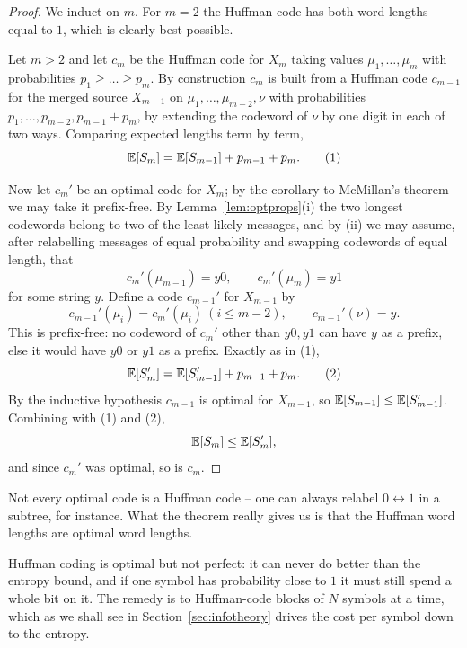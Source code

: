 \documentclass[a4paper]{scrartcl}
\begin{document}
\begin{proof}
	We induct on $m$. For $m = 2$ the Huffman code has both word lengths equal to $1$, which is clearly best possible.

	Let $m > 2$ and let $c_m$ be the Huffman code for $X_m$ taking values $\mu_1, \dots, \mu_m$ with probabilities $p_1 \ge \dots \ge p_m$. By construction $c_m$ is built from a Huffman code $c_{m-1}$ for the merged source $X_{m-1}$ on $\mu_1, \dots, \mu_{m-2}, \nu$ with probabilities $p_1, \dots, p_{m-2}, p_{m-1}+p_m$, by extending the codeword of $\nu$ by one digit in each of two ways. Comparing expected lengths term by term,
	\begin{equation*}\mathbb{E}[S_m] = \mathbb{E}[S_{m-1}] + p_{m-1} + p_m. \tag{1}\end{equation*}

	Now let $c_m'$ be an optimal code for $X_m$; by the corollary to McMillan's theorem we may take it prefix-free. By Lemma~\ref{lem:optprops}(i) the two longest codewords belong to two of the least likely messages, and by (ii) we may assume, after relabelling messages of equal probability and swapping codewords of equal length, that
	$$c_m'(\mu_{m-1}) = y0, \qquad c_m'(\mu_m) = y1$$
	for some string $y$. Define a code $c_{m-1}'$ for $X_{m-1}$ by
	$$c_{m-1}'(\mu_i) = c_m'(\mu_i) \ (i \le m-2), \qquad c_{m-1}'(\nu) = y.$$
	This is prefix-free: no codeword of $c_m'$ other than $y0, y1$ can have $y$ as a prefix, else it would have $y0$ or $y1$ as a prefix. Exactly as in (1),
	\begin{equation*}\mathbb{E}[S_m'] = \mathbb{E}[S_{m-1}'] + p_{m-1} + p_m. \tag{2}\end{equation*}
	By the inductive hypothesis $c_{m-1}$ is optimal for $X_{m-1}$, so $\mathbb{E}[S_{m-1}] \le \mathbb{E}[S_{m-1}']$. Combining with (1) and (2),
	$$\mathbb{E}[S_m] \le \mathbb{E}[S_m'],$$
	and since $c_m'$ was optimal, so is $c_m$.
\end{proof}

\begin{remark}
	Not every optimal code is a Huffman code -- one can always relabel $0 \leftrightarrow 1$ in a subtree, for instance. What the theorem really gives us is that the Huffman word lengths are optimal word lengths.

	Huffman coding is optimal but not perfect: it can never do better than the entropy bound, and if one symbol has probability close to $1$ it must still spend a whole bit on it. The remedy is to Huffman-code blocks of $N$ symbols at a time, which as we shall see in Section~\ref{sec:infotheory} drives the cost per symbol down to the entropy.
\end{remark}
\end{document}
